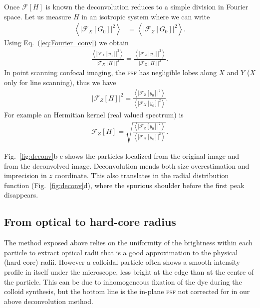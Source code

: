 \documentclass[8.5pt,twoside,twocolumn]{article}
\begin{document}
Once $\mathcal{F}[H]$ is known the deconvolution reduces to a simple division in Fourier space. Let us measure $H$ in an isotropic system where we can write
\begin{eqnarray}
\left\langle \left|\mathcal{F}_X[G_0]\right|^2 \right\rangle  &= \left\langle \left|\mathcal{F}_Z[G_0]\right|^2 \right\rangle. 
\end{eqnarray}
Using Eq.~(\ref{eq:Fourier_conv}) we obtain 
\begin{eqnarray}
\frac{\left\langle\left|\mathcal{F}_X[y_0]\right|^2 \right\rangle}{\left|\mathcal{F}_X[H]\right|^2}  = \frac{\left\langle \left|\mathcal{F}_Z[y_0]\right|^2\right\rangle}{\left|\mathcal{F}_Z[H]\right|^2}. 
\end{eqnarray}
In point scanning confocal imaging, the \textsc{psf} has negligible lobes along $X$ and $Y$ ($X$ only for line scanning), thus we have 
\begin{eqnarray}
\left|\mathcal{F}_Z[H]\right|^2 = \frac{\left\langle \left|\mathcal{F}_Z[y_0]\right|^2\right\rangle}{\left\langle\left|\mathcal{F}_X[y_0]\right|^2 \right\rangle}.
\end{eqnarray}
For example an Hermitian kernel (real valued spectrum) is 
\begin{eqnarray}
\mathcal{F}_Z[H] = \sqrt{\frac{\left\langle \left|\mathcal{F}_Z[y_0]\right|^2\right\rangle}{\left\langle\left|\mathcal{F}_X[y_0]\right|^2 \right\rangle}}.
\end{eqnarray}

Fig.~\ref{fig:deconv}b-c shows the particles localized from the original image and from the deconvolved image. Deconvolution mends both size overestimation and imprecision in $z$ coordinate. This also translates in the radial distribution function (Fig.~\ref{fig:deconv}d), where the spurious shoulder before the first peak disappears.

\subsection{From optical to hard-core radius}

The method exposed above relies on the uniformity of the brightness within each particle to extract optical radii that is a good approximation to the physical (hard core) radii. However a colloidal particle often shows a smooth intensity profile in itself under the microscope, less bright at the edge than at the centre of the particle. This can be due to inhomogeneous fixation of the dye during the colloid synthesis, but the bottom line is the in-plane \textsc{psf} not corrected for in our above deconvolution method.
\end{document}
